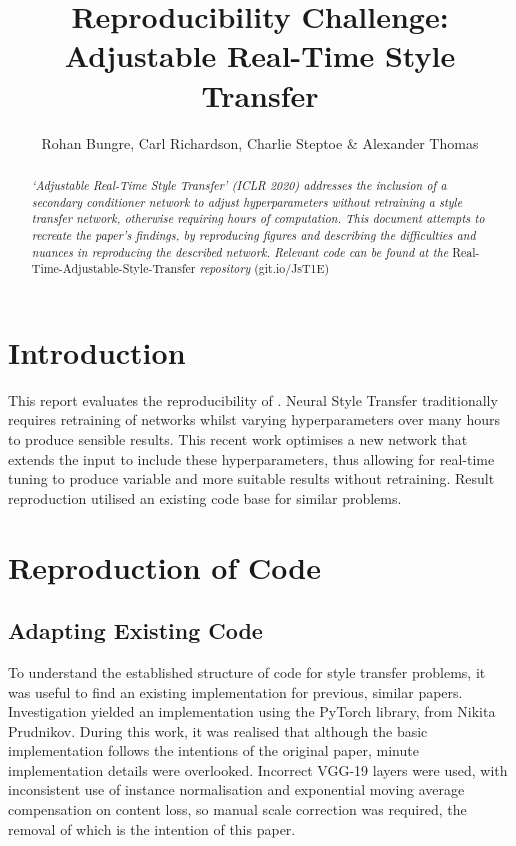 \documentclass{article} %
\title{Reproducibility Challenge: Adjustable Real-Time Style Transfer}
\author{Rohan Bungre, Carl Richardson, Charlie Steptoe \& Alexander Thomas}
\begin{document}
\maketitle
\begin{abstract}
\emph{`Adjustable Real-Time Style Transfer' (ICLR 2020) addresses the inclusion of a secondary conditioner network to adjust hyperparameters without retraining a style transfer network, otherwise requiring hours of computation. This document attempts to recreate the paper's findings, by reproducing figures and describing the difficulties and nuances in reproducing the described network. Relevant code can be found at the} Real-Time-Adjustable-Style-Transfer \emph{repository} (git.io/JsT1E)
\end{abstract}

\section{Introduction}
This report evaluates the reproducibility of \cite{babaeizadeh2018adjustable}. Neural Style Transfer traditionally requires retraining of networks whilst varying hyperparameters over many hours to produce sensible results. This recent work optimises a new network that extends the input to include these hyperparameters, thus allowing for real-time tuning to produce variable and more suitable results without retraining. Result reproduction utilised an existing code base for similar problems.

\section{Reproduction of Code}

\subsection{Adapting Existing Code}

To understand the established structure of code for style transfer problems, it was useful to find an existing implementation for previous, similar papers. Investigation yielded an implementation using the PyTorch library, from Nikita Prudnikov. During this work, it was realised that although the basic implementation follows the intentions of the original paper, minute implementation details were overlooked. Incorrect VGG-19 layers were used, with inconsistent use of instance normalisation and exponential moving average compensation on content loss, so manual scale correction was required, the removal of which is the intention of this paper.
\end{document}
